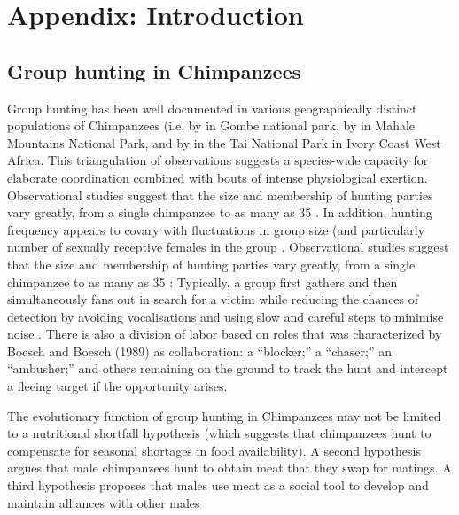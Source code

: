 \chapter{\label{app1:intro}Appendix: Introduction}












\section{Group hunting in Chimpanzees\label{sect:groupHunt}}
Group hunting has been well documented in various geographically distinct populations of Chimpanzees (i.e. by \textcite{Goodall1986}  in Gombe national park, by \textcite{Uehara1997} in Mahale Mountains National Park, and by \textcite{Boesch1989, Boesch1994} in the Tai National Park in Ivory Coast West Africa.  This triangulation of observations suggests a species-wide capacity for elaborate coordination combined with bouts of intense physiological exertion.   Observational studies suggest that the size and membership of hunting parties vary greatly, from a single chimpanzee to as many as 35 \citep{Stanford1994}.  In addition, hunting frequency appears to covary with fluctuations in group size (and particularly number of sexually receptive females in the group \citep{Stanford1996}.
Observational studies suggest that the size and membership of hunting parties vary greatly, from a single chimpanzee to as many as 35 \citep{Stanford1994}: Typically, a group first gathers and then simultaneously fans out in search for a victim while reducing the chances of detection by avoiding vocalisations and using slow and careful steps to minimise noise \citep{Boesch1989,Mitani2001}.  There is also a division of labor based on roles that was characterized by Boesch and Boesch (1989) as collaboration: a ``blocker;'' a ``chaser;'' an ``ambusher;'' and others remaining on the ground to track the hunt and intercept a fleeing target if the opportunity arises.

The evolutionary function of group hunting in Chimpanzees may not be limited to a nutritional shortfall hypothesis (which suggests that chimpanzees hunt to compensate for seasonal shortages in food availability).  A second hypothesis argues that male chimpanzees hunt to obtain meat that they swap for matings. A third hypothesis proposes that males use meat as a social tool to develop and maintain alliances with other males \citep{Mitani2001}


